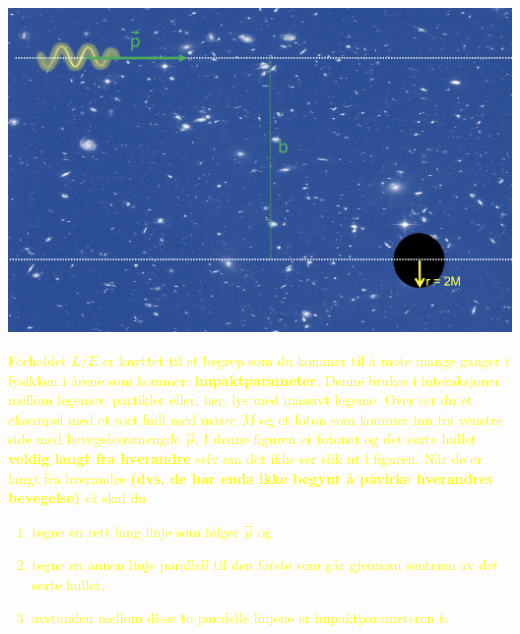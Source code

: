 \documentclass{beamer}
\newcommand{\pagebutton}[1]{\setbeamertemplate{button}{\tikz\node[inner xsep = 5pt, draw = structure!90, fill = green(ryb), rounded corners = 8pt]{\color{amber}\Large\insertbuttontext};}\beamerbutton{#1}}
\begin{document}
\begin{frame}
{
\textcolor{yellow}{\small
\centerline{\includegraphics[scale=0.1]{media/impact1.png}}
Forholdet $L/E$ er knyttet til et begrep som du kommer til å møte mange ganger i fysikken i årene som kommer: {\bf impaktparameter}. Denne brukes i interaksjoner mellom legemer, partikler eller, her, lys med massivt legeme. Over ser du et eksempel med et sort hull med masse $M$ og et foton som kommer inn fra venstre side med bevegelsersmengde $\vec{p}$. I denne figuren er fotonet og det sorte hullet {\bf veldig langt fra hverandre} selv om det ikke ser slik ut i figuren. Når de er langt fra hverandre {\bf (dvs. de har enda ikke begynt å påvirke hverandres bevegelse)} så skal du
\begin{enumerate}
\item \textcolor{yellow}{tegne en rett lang linje som følger $\vec{p}$ og}
\item \textcolor{yellow}{tegne en annen linje parallell til den første som går gjennom sentrum av det sorte hullet,}
\item \textcolor{yellow}{avstanden mellom disse to paralelle linjene er impaktparameteren $b$.}
\end{enumerate}
}
\hyperlink{denim_eu18}{\pagebutton{SIDE 25/31/84}}}



\end{frame}
\end{document}
